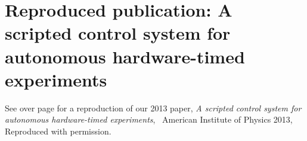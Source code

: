 \section{Reproduced publication: A scripted control system for autonomous hardware-timed experiments}

See over page for a reproduction of our 2013 paper, \emph{A scripted control system for autonomous hardware-timed experiments}, \textcopyright\ American Institute of Physics 2013, Reproduced with permission.



